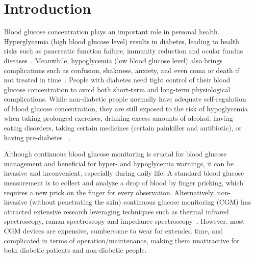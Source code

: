 
\section{Introduction}
\label{sec:intro}
Blood glucose concentration plays an important role in personal health.
Hyperglycemia (high blood glucose level) results in diabetes, leading to health risks such as pancreatic function failure, immunity reduction and ocular fundus diseases~\cite{bib:DC95:Klein}.
Meanwhile, hypoglycemia (low blood glucose level) also brings complications such as confusion, shakiness, anxiety, and even coma or death if not treated in time~\cite{bib:AJM91:DCCT}.
People with diabetes need tight control of their blood glucose concentration to avoid both short-term and long-term physiological complications.
While non-diabetic people normally have adequate self-regulation of blood glucose concentration, they are still exposed to the risk of hypoglycemia when taking prolonged exercises, drinking excess amounts of alcohol, having eating disorders, taking certain medicines (\eg certain painkiller and antibiotic), or having pre-diabetes~\cite{bib:JCEM13:Eckert} \cite{bib:NEJM82:Felig}.

Although continuous blood glucose monitoring is crucial for blood glucose management and beneficial for hyper- and hypoglycemia warnings, it can be invasive and inconvenient, especially during daily life.
A standard blood glucose measurement is to collect and analyze a drop of blood by finger pricking, which requires a new prick on the finger for every observation.
Alternatively, non-invasive (without penetrating the skin) continuous glucose monitoring (CGM) has attracted extensive research leveraging techniques such as thermal infrared spectroscopy, raman spectroscopy and impedance spectroscopy~\cite{bib:JDST10:Vaddiraju}.
However, most CGM devices are expensive, cumbersome to wear for extended time, and complicated in terms of operation/maintenance, making them unattractive for both diabetic patients and non-diabetic people.

